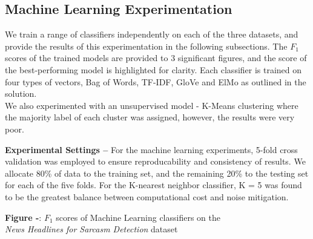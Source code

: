 \documentclass[12pt,a4paper]{article}
\begin{document}

\subsection{Machine Learning Experimentation}



\noindent We train a range of classifiers independently on each of the three datasets, and provide the results of this experimentation in the following subsections. The $F_{1}$ scores of the trained models are provided to 3 significant figures, and the score of the best-performing model is highlighted for clarity. Each classifier is trained on four types of vectors, Bag of Words, TF-IDF, GloVe and ElMo as outlined in the solution.\\

We also experimented with an unsupervised model - K-Means clustering where the majority label of each cluster was assigned, however, the results were very poor.



\noindent \textbf{Experimental Settings --} For the machine learning experiments, 5-fold cross validation was employed to ensure reproducability and consistency of results. We allocate 80\% of data to the training set, and the remaining 20\% to the testing set for each of the five folds. For the K-nearest neighbor classifier, K = 5 was found to be the greatest balance between computational cost and noise mitigation.




\begin{center}
	\textbf{Figure -}: $F_1$ scores of Machine Learning classifiers on the \\\textit{News Headlines for Sarcasm Detection} dataset
\end{center}
\end{document}
